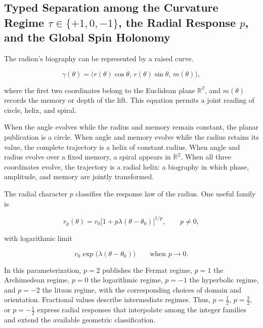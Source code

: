 \subsection{Typed Separation among the Curvature Regime \(\tau\in\{+1,0,-1\}\), the Radial Response \(p\), and the Global Spin Holonomy}

The radion's biography can be represented by a raised curve.

\[
\gamma(\theta)
=
\bigl(r(\theta)\cos\theta,\,
r(\theta)\sin\theta,\,
m(\theta)\bigr),
\]

where the first two coordinates belong to the Euclidean plane \(\mathbb R^2\), and \(m(\theta)\) records the memory or depth of the lift. This equation permits a joint reading of circle, helix, and spiral.

When the angle evolves while the radius and memory remain constant, the planar publication is a circle. When angle and memory evolve while the radius retains its value, the complete trajectory is a helix of constant radius. When angle and radius evolve over a fixed memory, a spiral appears in \(\mathbb R^2\). When all three coordinates evolve, the trajectory is a radial helix: a biography in which phase, amplitude, and memory are jointly transformed.

The radial character \(p\) classifies the response law of the radius. One useful family is

\[
r_p(\theta)
=
r_0\bigl[1+p\lambda(\theta-\theta_0)\bigr]^{1/p},
\qquad p\neq 0,
\]

with logarithmic limit

\[
r_0\exp\bigl(\lambda(\theta-\theta_0)\bigr)
\qquad\text{when }p\to0.
\]

In this parameterization, \(p=2\) publishes the Fermat regime, \(p=1\) the Archimedean regime, \(p=0\) the logarithmic regime, \(p=-1\) the hyperbolic regime, and \(p=-2\) the lituus regime, with the corresponding choices of domain and orientation. Fractional values describe intermediate regimes. Thus, \(p=\tfrac12\), \(p=\tfrac32\), or \(p=-\tfrac12\) express radial responses that interpolate among the integer families and extend the available geometric classification.

